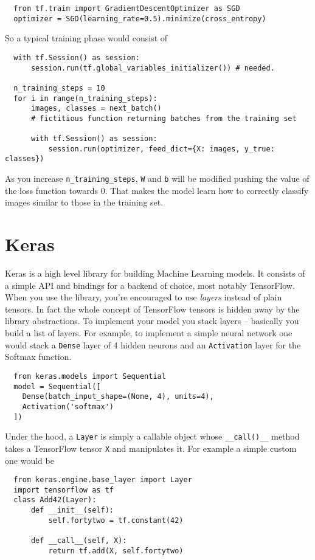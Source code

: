 \begin{verbatim}
  from tf.train import GradientDescentOptimizer as SGD
  optimizer = SGD(learning_rate=0.5).minimize(cross_entropy)
\end{verbatim}

So a typical training phase would consist of

\begin{verbatim}
  with tf.Session() as session:
      session.run(tf.global_variables_initializer()) # needed.

  n_training_steps = 10
  for i in range(n_training_steps):
      images, classes = next_batch()
      # fictitious function returning batches from the training set

      with tf.Session() as session:
          session.run(optimizer, feed_dict={X: images, y_true: classes})
\end{verbatim}

As you increase \texttt{n\_training\_steps}, \texttt{W} and \texttt{b}
will be modified pushing the value of the loss function towards 0. That
makes the model learn how to correctly classify images similar to those
in the training set.

\section{Keras}
\label{sec:keras}

Keras is a high level library for building Machine Learning models. It
consists of a simple API and bindings for a backend of choice, most
notably TensorFlow. When you use the library, you're encouraged to use
\emph{layers} instead of plain tensors. In fact the whole concept of
TensorFlow tensors is hidden away by the library abstractions. To
implement your model you stack layers -- basically you build a list of
layers. For example, to implement a simple neural network one would
stack a \texttt{Dense} layer of 4 hidden neurons and an
\texttt{Activation} layer for the Softmax function.

\begin{verbatim}
  from keras.models import Sequential
  model = Sequential([
    Dense(batch_input_shape=(None, 4), units=4),
    Activation('softmax')
  ])
\end{verbatim}

Under the hood, a \texttt{Layer} is simply a callable object whose
\texttt{\_\_call()\_\_} method takes a TensorFlow tensor \texttt{X} and
manipulates it. For example a simple custom one would be
\begin{verbatim}
  from keras.engine.base_layer import Layer
  import tensorflow as tf
  class Add42(Layer):
      def __init__(self):
          self.fortytwo = tf.constant(42)

      def __call__(self, X):
          return tf.add(X, self.fortytwo)
\end{verbatim}

